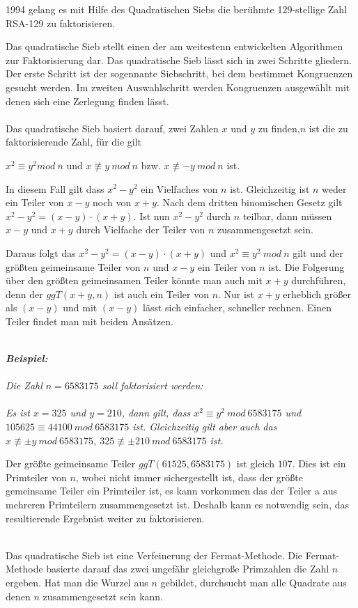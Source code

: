 \documentclass[10pt, bigheadings]{scrartcl}
\begin{document}
1994 gelang es mit Hilfe des Quadratischen Siebs die berühmte 129-stellige
Zahl RSA-129 zu faktorisieren.

Das quadratische Sieb stellt einen der am weitestenn entwickelten Algorithmen
zur Faktorisierung dar. Das quadratische Sieb lässt sich in zwei Schritte
gliedern. Der erste Schritt ist der sogennante Siebschritt, bei dem bestimmet
Kongruenzen gesucht werden. Im zweiten Auswahlschritt werden Kongruenzen ausgewählt
mit denen sich eine Zerlegung finden lässt.\\\\
Das quadratische Sieb basiert darauf, zwei Zahlen $x$ und $y$ zu finden,$n$ ist die zu
faktorisierende Zahl, für die gilt
\begin{center}
$x^2 \equiv y^2 mod \ n$ und $x \not\equiv y\ mod \ n$ bzw. $x \not\equiv -y\ mod \ n$ ist.
\end{center}

In diesem Fall gilt dass $x^2-y^2$ ein Vielfaches von $n$ ist. Gleichzeitig ist $n$ weder
ein Teiler von $x-y$ noch von $x+y$. Nach dem dritten binomischen Gesetz gilt
$x^2 - y^2 = (x-y)\cdot(x+y)$. Ist nun $x^2 - y^2$ durch $n$ teilbar, dann müssen $x-y$ und
$x+y$ durch Vielfache der Teiler von $n$ zusammengesetzt sein.

Daraus folgt das $x^2-y^2 = (x-y)\cdot(x+y)$ und $x^2\equiv y^2 \ mod\ n$ gilt und der größten
geimeinsame Teiler von $n$ und $x-y$ ein Teiler von $n$ ist. Die Folgerung über den
größten geimeinsamen Teiler könnte man auch mit $x+y$ durchführen, denn der
$ggT(x+y,n)$ ist auch ein Teiler von $n$. Nur ist $x+y$ erheblich größer als $(x-y)$
und mit $(x-y)$ lässt sich einfacher, schneller rechnen. Einen Teiler findet man mit beiden
Ansätzen.\\\\
{\it
\textbf{Beispiel:}\\\\
Die Zahl $n=6583175$ soll faktorisiert werden:\\\\
Es ist $x = 325$ und $y = 210$, dann gilt,
dass $x^2 \equiv y^2\ mod\ 6583175$ und $105625 \equiv 44100\ mod\ 6583175$ ist.
Gleichzeitig gilt aber auch das
$x \not\equiv \pm y\ mod\ 6583175$, $325 \not\equiv \pm 210\ mod\ 6583175$ ist.


Der größte geimeinsame Teiler $ggT(61525,6583175)$ ist gleich $107$. Dies ist ein
Primteiler von $n$, wobei nicht immer sichergestellt ist, dass der größte
gemeinsame Teiler ein Primteiler ist, es kann vorkommen das der Teiler a
aus mehreren Primteilern zusammengesetzt ist. Deshalb kann es notwendig sein,
das resultierende Ergebnist weiter zu faktorisieren.\\\\
} %
Das quadratische Sieb ist eine Verfeinerung der Fermat-Methode. Die Fermat-Methode
basierte darauf das zwei ungefähr gleichgroße Primzahlen die Zahl $n$ ergeben.
Hat man die Wurzel aus $n$ gebildet, durchsucht man alle Quadrate aus denen
$n$ zusammengesetzt sein kann.
\end{document}
